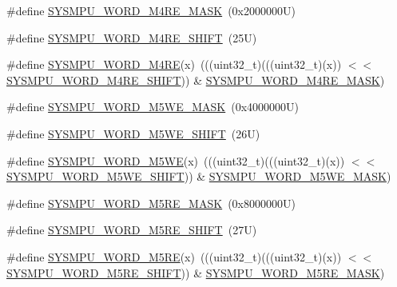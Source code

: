 \begin{DoxyCompactItemize}
\item 
\#define \mbox{\hyperlink{group___s_y_s_m_p_u___register___masks_ga10a274c859895c807fc418dc8205986f}{S\+Y\+S\+M\+P\+U\+\_\+\+W\+O\+R\+D\+\_\+\+M4\+R\+E\+\_\+\+M\+A\+SK}}~(0x2000000\+U)
\item 
\#define \mbox{\hyperlink{group___s_y_s_m_p_u___register___masks_gaf9764803abe1d19e7c2f502b2d49e22b}{S\+Y\+S\+M\+P\+U\+\_\+\+W\+O\+R\+D\+\_\+\+M4\+R\+E\+\_\+\+S\+H\+I\+FT}}~(25\+U)
\item 
\#define \mbox{\hyperlink{group___s_y_s_m_p_u___register___masks_gaa4398a1dbf2f030ad246a89dfcdc8952}{S\+Y\+S\+M\+P\+U\+\_\+\+W\+O\+R\+D\+\_\+\+M4\+RE}}(x)~(((uint32\+\_\+t)(((uint32\+\_\+t)(x)) $<$$<$ \mbox{\hyperlink{group___s_y_s_m_p_u___register___masks_gaf9764803abe1d19e7c2f502b2d49e22b}{S\+Y\+S\+M\+P\+U\+\_\+\+W\+O\+R\+D\+\_\+\+M4\+R\+E\+\_\+\+S\+H\+I\+FT}})) \& \mbox{\hyperlink{group___s_y_s_m_p_u___register___masks_ga10a274c859895c807fc418dc8205986f}{S\+Y\+S\+M\+P\+U\+\_\+\+W\+O\+R\+D\+\_\+\+M4\+R\+E\+\_\+\+M\+A\+SK}})
\item 
\#define \mbox{\hyperlink{group___s_y_s_m_p_u___register___masks_ga37394e198992080135e62dbd5fed7da5}{S\+Y\+S\+M\+P\+U\+\_\+\+W\+O\+R\+D\+\_\+\+M5\+W\+E\+\_\+\+M\+A\+SK}}~(0x4000000\+U)
\item 
\#define \mbox{\hyperlink{group___s_y_s_m_p_u___register___masks_gae77d70249e11a27948536215016147f6}{S\+Y\+S\+M\+P\+U\+\_\+\+W\+O\+R\+D\+\_\+\+M5\+W\+E\+\_\+\+S\+H\+I\+FT}}~(26\+U)
\item 
\#define \mbox{\hyperlink{group___s_y_s_m_p_u___register___masks_ga26b604b00befa37ea042c3d66f5cc87b}{S\+Y\+S\+M\+P\+U\+\_\+\+W\+O\+R\+D\+\_\+\+M5\+WE}}(x)~(((uint32\+\_\+t)(((uint32\+\_\+t)(x)) $<$$<$ \mbox{\hyperlink{group___s_y_s_m_p_u___register___masks_gae77d70249e11a27948536215016147f6}{S\+Y\+S\+M\+P\+U\+\_\+\+W\+O\+R\+D\+\_\+\+M5\+W\+E\+\_\+\+S\+H\+I\+FT}})) \& \mbox{\hyperlink{group___s_y_s_m_p_u___register___masks_ga37394e198992080135e62dbd5fed7da5}{S\+Y\+S\+M\+P\+U\+\_\+\+W\+O\+R\+D\+\_\+\+M5\+W\+E\+\_\+\+M\+A\+SK}})
\item 
\#define \mbox{\hyperlink{group___s_y_s_m_p_u___register___masks_gab887aca3aba6ad98fae31b0f9f6be82b}{S\+Y\+S\+M\+P\+U\+\_\+\+W\+O\+R\+D\+\_\+\+M5\+R\+E\+\_\+\+M\+A\+SK}}~(0x8000000\+U)
\item 
\#define \mbox{\hyperlink{group___s_y_s_m_p_u___register___masks_ga7700eb4355e959ba3432c2bd954231f6}{S\+Y\+S\+M\+P\+U\+\_\+\+W\+O\+R\+D\+\_\+\+M5\+R\+E\+\_\+\+S\+H\+I\+FT}}~(27\+U)
\item 
\#define \mbox{\hyperlink{group___s_y_s_m_p_u___register___masks_ga0380e6a9a8d6d0703972b9b016b23d75}{S\+Y\+S\+M\+P\+U\+\_\+\+W\+O\+R\+D\+\_\+\+M5\+RE}}(x)~(((uint32\+\_\+t)(((uint32\+\_\+t)(x)) $<$$<$ \mbox{\hyperlink{group___s_y_s_m_p_u___register___masks_ga7700eb4355e959ba3432c2bd954231f6}{S\+Y\+S\+M\+P\+U\+\_\+\+W\+O\+R\+D\+\_\+\+M5\+R\+E\+\_\+\+S\+H\+I\+FT}})) \& \mbox{\hyperlink{group___s_y_s_m_p_u___register___masks_gab887aca3aba6ad98fae31b0f9f6be82b}{S\+Y\+S\+M\+P\+U\+\_\+\+W\+O\+R\+D\+\_\+\+M5\+R\+E\+\_\+\+M\+A\+SK}})
$$
\end{DoxyCompactItemize}

